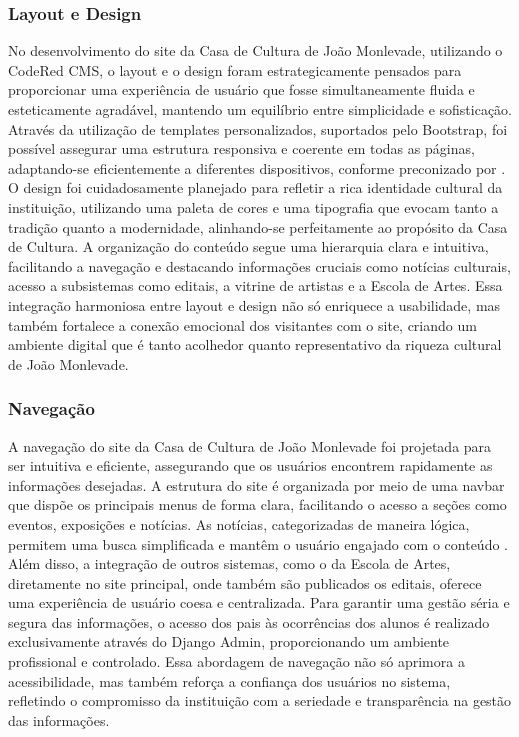 \subsubsection{Layout e Design}

No desenvolvimento do site da Casa de Cultura de João Monlevade, utilizando o CodeRed CMS, o layout e o design foram estrategicamente pensados para proporcionar uma experiência de usuário que fosse simultaneamente fluida e esteticamente agradável, mantendo um equilíbrio entre simplicidade e sofisticação. Através da utilização de templates personalizados, suportados pelo Bootstrap, foi possível assegurar uma estrutura responsiva e coerente em todas as páginas, adaptando-se eficientemente a diferentes dispositivos, conforme preconizado por \cite{liddle2013design}. O design foi cuidadosamente planejado para refletir a rica identidade cultural da instituição, utilizando uma paleta de cores e uma tipografia que evocam tanto a tradição quanto a modernidade, alinhando-se perfeitamente ao propósito da Casa de Cultura. A organização do conteúdo segue uma hierarquia clara e intuitiva, facilitando a navegação e destacando informações cruciais como notícias culturais, acesso a subsistemas como editais, a vitrine de artistas e a Escola de Artes. Essa integração harmoniosa entre layout e design não só enriquece a usabilidade, mas também fortalece a conexão emocional dos visitantes com o site, criando um ambiente digital que é tanto acolhedor quanto representativo da riqueza cultural de João Monlevade.

\subsubsection{Navegação}

A navegação do site da Casa de Cultura de João Monlevade foi projetada para ser intuitiva e eficiente, assegurando que os usuários encontrem rapidamente as informações desejadas. A estrutura do site é organizada por meio de uma navbar que dispõe os principais menus de forma clara, facilitando o acesso a seções como eventos, exposições e notícias. As notícias, categorizadas de maneira lógica, permitem uma busca simplificada e mantêm o usuário engajado com o conteúdo \cite{nielsen2012usability}. Além disso, a integração de outros sistemas, como o da Escola de Artes, diretamente no site principal, onde também são publicados os editais, oferece uma experiência de usuário coesa e centralizada. Para garantir uma gestão séria e segura das informações, o acesso dos pais às ocorrências dos alunos é realizado exclusivamente através do Django Admin, proporcionando um ambiente profissional e controlado. Essa abordagem de navegação não só aprimora a acessibilidade, mas também reforça a confiança dos usuários no sistema, refletindo o compromisso da instituição com a seriedade e transparência na gestão das informações.

